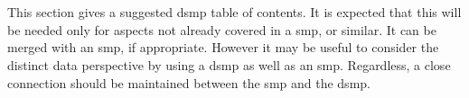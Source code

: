 %
%
\chapter{} \label{bkm:plan}


This section gives a suggested \gls{dsmp} table of contents. It is expected that this will be needed only for aspects not already covered in a \gls{smp}, or similar. It can be merged with an \gls{smp}, if appropriate. However it may be useful to consider the distinct data perspective by using a \gls{dsmp} as well as an \gls{smp}. Regardless, a close connection should be maintained between the \gls{smp} and the \gls{dsmp}.

